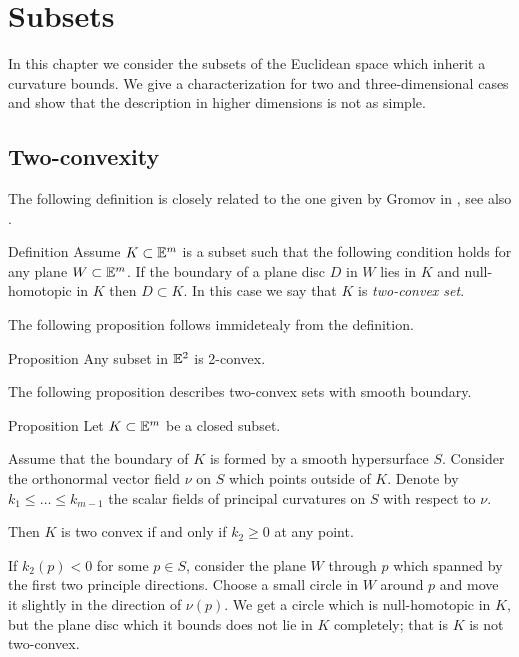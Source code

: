 \chapter{Subsets}

In this chapter we consider the subsets of the Euclidean space which inherit a curvature bounds.
We give a characterization for two and three-dimensional cases
and show that the description in higher dimensions is not as simple.

\section{Two-convexity}

The following definition is closely related to the one given by Gromov in \cite[\S\textonehalf]{gromov:SaGMC}, see also \cite{panov-petrunin:sweeping}.

\begin{thm}{Definition}\label{def:two-convex}
Assume $K\subset \EE^m$ is a subset
such that the following condition holds for any plane $W\subset\EE^m$.
If the boundary of a plane disc $D$ in $W$ lies in $K$ and null-homotopic in $K$
then $D\subset K$.
In this case we say that $K$ is \emph{two-convex set}.
\end{thm}

The following proposition follows immidetealy from the definition.

\begin{thm}{Proposition}
Any subset in $\mathbb{E}^2$ is 2-convex.
\end{thm}

The following proposition describes two-convex sets with smooth boundary.

\begin{thm}{Proposition}
Let $K\subset \EE^m$ be a closed subset.

Assume that the boundary of $K$ is formed by a smooth hypersurface $S$.
Consider the orthonormal vector field $\nu$ on $S$ which points outside of $K$.
Denote by $k_1\le \dots\le k_{m-1}$ the scalar fields of principal curvatures on $S$ with respect to $\nu$.

Then $K$ is two convex if and only if $k_2\ge 0$ at any point.
\end{thm}

If $k_2(p)<0$ for some $p\in S$,
consider the plane $W$ through $p$ which spanned by the first two principle directions.
Choose a small circle in $W$ around $p$ and move it slightly in the direction of $\nu(p)$.
We get a circle which is null-homotopic in $K$,
but the plane disc which it bounds does not lie in $K$ completely;
that is $K$ is not two-convex.

